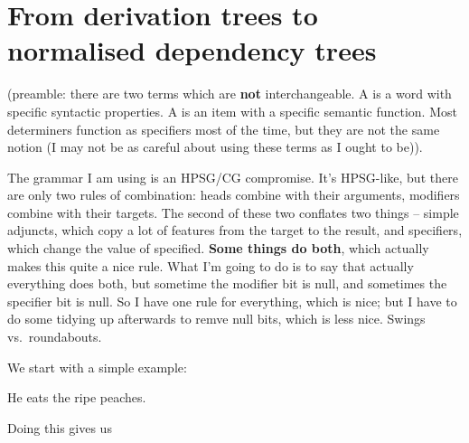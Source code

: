 \documentclass[11pt,a4paper]{article}
\begin{document}
\section{From derivation trees to normalised dependency trees}

\medpara
(preamble: there are two terms which are \textbf{not} interchangeable. A
 is a word with specific syntactic properties. A
 is an item with a specific semantic function. Most
determiners function as specifiers most of the time, but they are not
the same notion
 (I may not be as careful about using these terms as I ought to be)).

\medpara
The grammar I am using is an HPSG/CG compromise. It's HPSG-like, but
there are only two rules of combination: heads combine with their arguments,
modifiers combine with their targets. The second of these two
conflates two things -- simple adjuncts, which copy a lot of features
from the target to the result, and specifiers, which change the value
of specified. \textbf{Some things do both}, which actually makes this
quite a nice rule. What I'm going to do is to say that actually
everything does both, but sometime the modifier bit is null, and
sometimes the specifier bit is null. So I have one rule for
everything, which is nice; but I have to do some tidying up afterwards
to remve null bits, which is less nice. Swings vs.\ roundabouts.

\medpara 
We start with a simple example:

\begin{examples}
\item He eats the ripe peaches.
\end{examples}

Doing this gives us 
\end{document}
